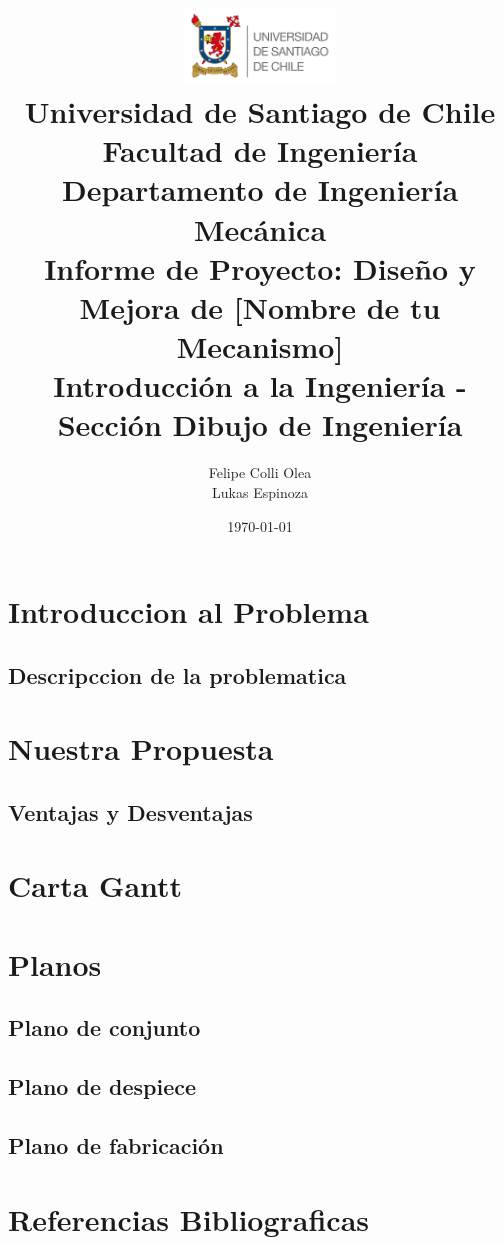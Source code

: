 \documentclass[11pt, a4paper]{article} %
\title{
    \vspace{-1cm} %
    \includegraphics[width=4cm]{usach.png}\\[1cm] %
    \textbf{Universidad de Santiago de Chile \\ Facultad de Ingeniería \\ Departamento de Ingeniería Mecánica}\\[2cm]
    \huge \textbf{Informe de Proyecto: Diseño y Mejora de [Nombre de tu Mecanismo]} \\
    \large Introducción a la Ingeniería - Sección Dibujo de Ingeniería
}
\author{
    Felipe Colli Olea \\
    Lukas Espinoza
}
\date{\today}
\begin{document}
\maketitle
\newpage
\tableofcontents


\section{Introduccion al Problema}
\subsection{Descripccion de la problematica}
\newpage


\section{Nuestra Propuesta}
\subsection{Ventajas y Desventajas}
\newpage


\section{Carta Gantt}
\section{Planos}
    \subsection{Plano de conjunto}
    \subsection{Plano de despiece}
    \subsection{Plano de fabricación}
    \newpage


\section{Referencias Bibliograficas}
\end{document}
